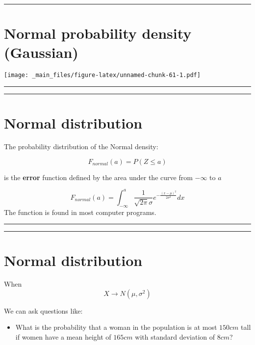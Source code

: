 \documentclass[
]{book}
\providecommand{\tightlist}{%
  \setlength{\itemsep}{0pt}\setlength{\parskip}{0pt}}
\begin{document}
\begin{center}\rule{0.5\linewidth}{0.5pt}\end{center}

\hypertarget{normal-probability-density-gaussian}{%
\section{Normal probability density (Gaussian)}\label{normal-probability-density-gaussian}}

\texttt{[image: \_main\_files/figure-latex/unnamed-chunk-61-1.pdf]}

\begin{center}\rule{0.5\linewidth}{0.5pt}\end{center}

\begin{center}\rule{0.5\linewidth}{0.5pt}\end{center}

\hypertarget{normal-distribution-1}{%
\section{Normal distribution}\label{normal-distribution-1}}

The probability distribution of the Normal density:

\[F_{normal}(a)=P(Z \leq a)\]

is the \textbf{error} function defined by the area under the curve from \(-\infty\) to \(a\)

\[F_{normal}(a)=\int_{-\infty}^{a}\frac{1}{\sqrt{2\pi}\sigma}e^{-\frac{(x-\mu)^2}{2\sigma^2}} dx\]
The function is found in most computer programs.

\begin{center}\rule{0.5\linewidth}{0.5pt}\end{center}

\begin{center}\rule{0.5\linewidth}{0.5pt}\end{center}

\hypertarget{normal-distribution-2}{%
\section{Normal distribution}\label{normal-distribution-2}}

When \[X \rightarrow N(\mu, \sigma^2)\]

We can ask questions like:

\begin{itemize}
\tightlist
\item
  What is the probability that a woman in the population is at most \(150cm\) tall if women have a mean height of \(165cm\) with standard deviation of \(8cm\)?
\end{itemize}
\end{document}
